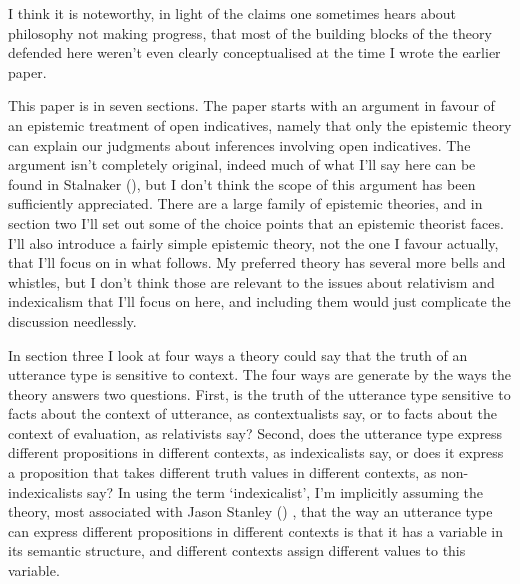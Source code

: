 \documentclass[
  11pt,
  letterpaper,
  DIV=11,
  numbers=noendperiod,
  oneside]{scrartcl}
\begin{document}
I think it is noteworthy, in light of the claims one sometimes hears
about philosophy not making progress, that most of the building blocks
of the theory defended here weren't even clearly conceptualised at the
time I wrote the earlier paper.

This paper is in seven sections. The paper starts with an argument in
favour of an epistemic treatment of open indicatives, namely that only
the epistemic theory can explain our judgments about inferences
involving open indicatives. The argument isn't completely original,
indeed much of what I'll say here can be found in Stalnaker
(), but I don't think the scope
of this argument has been sufficiently appreciated. There are a large
family of epistemic theories, and in section two I'll set out some of
the choice points that an epistemic theorist faces. I'll also introduce
a fairly simple epistemic theory, not the one I favour actually, that
I'll focus on in what follows. My preferred theory has several more
bells and whistles, but I don't think those are relevant to the issues
about relativism and indexicalism that I'll focus on here, and including
them would just complicate the discussion needlessly.

In section three I look at four ways a theory could say that the truth
of an utterance type is sensitive to context. The four ways are generate by the
ways the theory answers two questions. First, is the truth of the
utterance type sensitive to facts about the context of utterance, as
contextualists say, or to facts about the context of evaluation, as
relativists say? Second, does the utterance type express different
propositions in different contexts, as indexicalists say, or does it
express a proposition that takes different truth values in different
contexts, as non-indexicalists say? In using the term `indexicalist',
I'm implicitly assuming the theory, most associated with Jason Stanley
() , that the way an utterance
type can express different propositions in different contexts is that it
has a variable in its semantic structure, and different contexts assign
different values to this variable.
\end{document}
